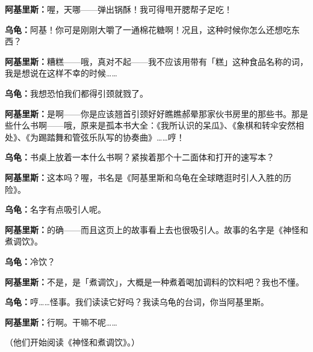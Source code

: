 \documentclass[
  12pt,
  twoside,
  openright,
  oldfontcommands,
]{memoir}
\newcommand{\dialogname}[1]{{\heifamily\bfseries #1}}
\begin{document}
\dialogname{阿基里斯：}喔，天哪------弹出锅酥！我可得甩开腮帮子足吃！

\dialogname{乌龟：}阿基！你可是刚刚大嚼了一通棉花糖啊！况且，这种时候你怎么还想吃东西？

\dialogname{阿基里斯：}糟糕------哦，真对不起------我不应该用带有「糕」这种食品名称的词，我是想说在这样不幸的时候\ldots\ldots{}

\dialogname{乌龟：}我想恐怕我们都得引颈就戮了。

\dialogname{阿基里斯：}是啊------你是应该翘首引颈好好瞧瞧郝晕那家伙书房里的那些书。那是些什么书啊------哦，原来是孤本书大全：《我所认识的呆瓜》、《象棋和转伞安然相处》、《为踢踏舞和管弦乐队写的协奏曲》\ldots\ldots 哼！

\dialogname{乌龟：}书桌上放着一本什么书啊？紧挨着那个十二面体和打开的速写本？

\dialogname{阿基里斯：}这本吗？喔，书名是《阿基里斯和乌龟在全球瞎逛时引人入胜的历险》。

\dialogname{乌龟：}名字有点吸引人呢。

\dialogname{阿基里斯：}的确------而且这页上的故事看上去也很吸引人。故事的名字是《神怪和煮调饮》。

\dialogname{乌龟：}冷饮？

\dialogname{阿基里斯：}不是，是「煮调饮」，大概是一种煮着喝加调料的饮料吧？我也不懂。

\dialogname{乌龟：}哼\ldots\ldots 怪事。我们读读它好吗？我读乌龟的台词，你当阿基里斯。

\dialogname{阿基里斯：}行啊。干嘛不呢\ldots\ldots{}

（他们开始阅读《神怪和煮调饮》。）
\end{document}
